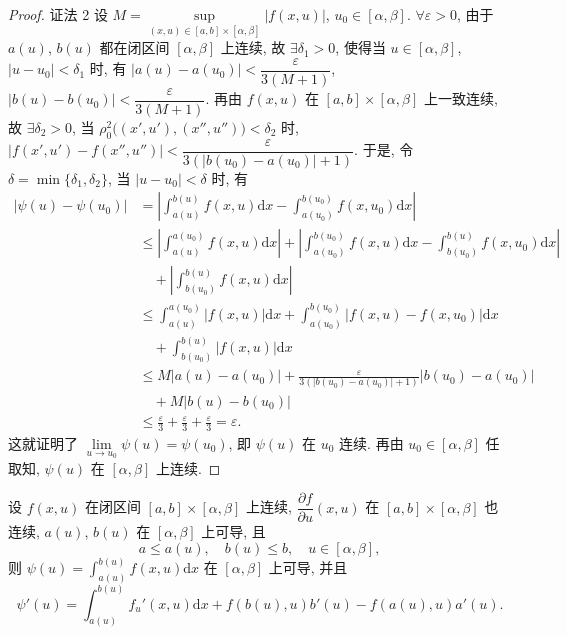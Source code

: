 \begin{proof}
证法 2 设 $M=\sup\limits_{(x,u)\in[a,b]\times[\alpha,\beta]}|f(x,u)|$, $u_{0}\in[\alpha,\beta]$. $\forall\varepsilon>0$, 由于 $a(u)$, $b(u)$ 都在闭区间 $[\alpha,\beta]$ 上连续, 故 $\exists\delta_{1}>0$, 使得当 $u\in[\alpha,\beta]$, $|u-u_{0}|<\delta_{1}$ 时, 有 $|a(u)-a(u_{0})|<\dfrac{\varepsilon}{3(M+1)}$, $|b(u)-b(u_{0})|<\dfrac{\varepsilon}{3(M+1)}$. 再由 $f(x,u)$ 在 $[a,b]\times[\alpha,\beta]$ 上一致连续, 故 $\exists\delta_{2}>0$, 当 $\rho_{0}^{2}\big((x',u'),(x'',u'')\big)<\delta_{2}$ 时, $|f(x',u')-f(x'',u'')|<\dfrac{\varepsilon}{3(|b(u_{0})-a(u_{0})|+1)}$. 于是, 令 $\delta=\min\{\delta_{1},\delta_{2}\}$, 当 $|u-u_{0}|<\delta$ 时, 有
\[
  \begin{aligned}
    |\psi(u)-\psi(u_{0})|&=\left|\int_{a(u)}^{b(u)}f(x,u)\mathrm{d}x-\int_{a(u_{0})}^{b(u_{0})}f(x,u_{0})\mathrm{d}x\right|\\
    &\leqslant\left|\int_{a(u)}^{a(u_{0})}f(x,u)\mathrm{d}x\right|+\left|\int_{a(u_{0})}^{b(u_{0})}f(x,u)\mathrm{d}x-\int_{b(u_{0})}^{b(u)}f(x,u_{0})\mathrm{d}x\right|\\
    &\quad+\left|\int_{b(u_{0})}^{b(u)}f(x,u)\mathrm{d}x\right|\\
    &\leqslant\int_{a(u)}^{a(u_{0})}|f(x,u)|\mathrm{d}x+\int_{a(u_{0})}^{b(u_{0})}|f(x,u)-f(x,u_{0})|\mathrm{d}x\\
    &\quad+\int_{b(u_{0})}^{b(u)}|f(x,u)|\mathrm{d}x\\
    &\leqslant M|a(u)-a(u_{0})|+\frac{\varepsilon}{3(|b(u_{0})-a(u_{0})|+1)}|b(u_{0})-a(u_{0})|\\
    &\quad+M|b(u)-b(u_{0})|\\
    &\leqslant\frac{\varepsilon}{3}+\frac{\varepsilon}{3}+\frac{\varepsilon}{3}=\varepsilon.
  \end{aligned}
\]
这就证明了 $\lim\limits_{u\to u_{0}}\psi(u)=\psi(u_{0})$, 即 $\psi(u)$ 在 $u_{0}$ 连续. 再由 $u_{0}\in[\alpha,\beta]$ 任取知, $\psi(u)$ 在 $[\alpha,\beta]$ 上连续.
\end{proof}

\begin{theorem}[一般的参变量积分的求导公式]\label{thm:15.1.5}
设 $f(x,u)$ 在闭区间 $[a,b]\times[\alpha,\beta]$ 上连续, $\dfrac{\partial f}{\partial u}(x,u)$ 在 $[a,b]\times[\alpha,\beta]$ 也连续, $a(u)$, $b(u)$ 在 $[\alpha,\beta]$ 上可导, 且
\[
  a\leqslant a(u),\quad b(u)\leqslant b,\quad u\in[\alpha,\beta],
\]
则 $\psi(u)=\displaystyle\int_{a(u)}^{b(u)}f(x,u)\mathrm{d}x$ 在 $[\alpha,\beta]$ 上可导, 并且
\[
  \psi'(u)=\int_{a(u)}^{b(u)}f_{u}'(x,u)\mathrm{d}x+f(b(u),u)b'(u)-f(a(u),u)a'(u).
\]
\end{theorem}

